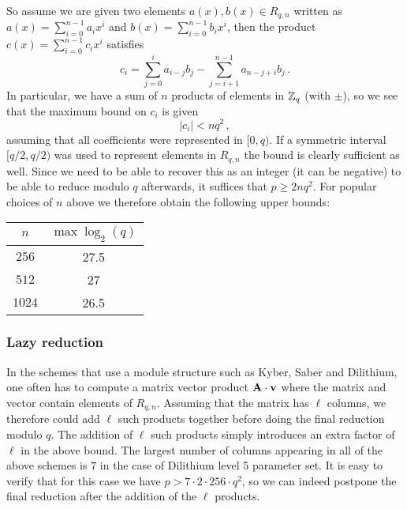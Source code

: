 So assume we are given two elements  $a(x), b(x) \in R_{q,n}$ written as $a(x) = \sum_{i = 0}^{n-1} a_i x^i$
and $b(x) = \sum_{i = 0}^{n-1} b_i x^i$, then the product $c(x) = \sum_{i = 0}^{n-1} c_i x^i$ satisfies
\[  c_i = \sum_{j = 0}^{i} a_{i -j} b_j  - \sum_{j = i+1}^{n-1} a_{n-j+i} b_{j}  \, . \]
In particular, we have a sum of $n$ products of elements
in $\mathbb{Z}_q$ (with $\pm$), so we see that the maximum bound on $c_i$ is given 
\[ |c_i| < n q^2 \, , \]
assuming that all coefficients were represented in $[0,q)$.  If a symmetric interval $[q/2, q/2)$ was used to 
represent elements in $R_{q, n}$ the bound is clearly sufficient as well.  
Since we need to be able to recover this as an integer (it can be negative) to be able to reduce modulo $q$ afterwards,
it suffices that $p \geq 2 n q^2$.  For popular choices of $n$ above we therefore obtain the following upper bounds:
\begin{center}
\begin{tabular}{|c|c|}
\hline
$n$ & $\max \log_2(q)$ \\
\hline
$256$ &  27.5 \\
$512$ &   27 \\
$1024$ &   26.5 \\
\hline
\end{tabular}
\end{center}

\subsubsection{Lazy reduction} In the schemes that use a module structure such as Kyber, Saber and Dilithium, 
one often has to compute 
a matrix vector product $\mathbf{A} \cdot \mathbf{v}$ where the matrix and vector contain elements of $R_{q,n}$.
Assuming that the matrix has $\ell$ columns, we therefore could add $\ell$ such products together before
doing the final reduction modulo $q$.  The addition of $\ell$ such products simply introduces an extra 
factor of $\ell$ in the above bound.  The largest number of columns appearing in all of the above schemes
is $7$ in the case of Dilithium level 5 parameter set.  It is easy to verify that for this case we have
$p > 7 \cdot 2 \cdot 256 \cdot q^2$, so we can indeed postpone the final reduction after the addition 
of the $\ell$ products.
